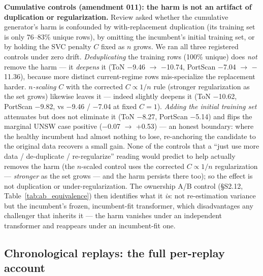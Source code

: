 \documentclass[a4paper,11pt]{article}
\makeatletter
\let\supp@subsection\subsection
\renewcommand{\subsection}{\FloatBarrier\supp@subsection}
\makeatother
\begin{document}
\textbf{Cumulative controls (amendment 011): the harm is not an artifact of duplication or regularization.} Review asked whether the cumulative generator's harm is confounded by with-replacement duplication (its training set is only 76--83\% unique rows), by omitting the incumbent's initial training set, or by holding the SVC penalty $C$ fixed as $n$ grows. We ran all three registered controls under zero drift. \emph{Deduplicating} the training rows (100\% unique) does \emph{not} remove the harm --- it \emph{deepens} it (ToN $-$9.46 $\to$ $-$10.74, PortScan $-$7.04 $\to$ $-$11.36), because more distinct current-regime rows mis-specialize the replacement harder. \emph{$n$-scaling} $C$ with the corrected $C\propto 1/n$ rule (stronger regularization as the set grows) likewise leaves it --- indeed slightly deepens it (ToN $-$10.62, PortScan $-$9.82, vs $-$9.46 / $-$7.04 at fixed $C{=}1$). \emph{Adding the initial training set} attenuates but does not eliminate it (ToN $-$8.27, PortScan $-$5.14) and flips the marginal UNSW case positive ($-$0.07 $\to$ +0.53) --- an honest boundary: where the healthy incumbent had almost nothing to lose, re-anchoring the candidate to the original data recovers a small gain. None of the controls that a ``just use more data / de-duplicate / re-regularize'' reading would predict to help actually removes the harm (the $n$-scaled control uses the corrected $C\propto 1/n$ regularization --- \emph{stronger} as the set grows --- and the harm persists there too); so the effect is not duplication or under-regularization. The ownership A/B control (\S S2.12, Table~\ref{tab:ab_equivalence}) then identifies what it \emph{is}: not re-estimation variance but the incumbent's frozen, incumbent-fit transformer, which disadvantages any challenger that inherits it --- the harm vanishes under an independent transformer and reappears under an incumbent-fit one.

\subsection{Chronological replays: the full per-replay account}
\end{document}
